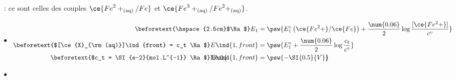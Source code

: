 \documentclass[a4paper, 10pt, landscape, twocolumn]{book}
\begin{document}
\begin{tcb*}[breakable]
\begin{minipage}[c]{.30\linewidth}
\begin{center}
{			}
		\end{center}
	\end{minipage}
	\tcblower
	\begin{enumerate}[label=\sqenumi]
		~: ce sont celles des couples
		$\ce{{Fe}^2+_{\rm(aq)}/Fe}$ et $\ce{{Fe}^3+_{\rm(aq)}/{Fe}^2+_{\rm(aq)}}$.
		\begin{itemize}
			\item
			      \vspace{-15pt}
			      \begin{align*}
				      \beforetext{\hspace{2.5cm}$\Ra$}
				      E_1
				                     & =
				      \psw{%
					      E_1^\circ \left( \ce{Fe^2+}/\ce{Fe} \right) +
					      \frac{\num{0.06}}{2} \log \frac{[\ce{Fe^2+}]}{c^\circ}
				      }%
				      \\
				      \beforetext{$[\ce{X}_{\rm(aq)}]\ind{front} = c_t \Ra $}
				      E\ind{1,front} & =
				      \psw{E_1^\circ + \frac{\num{0.06}}{2}\log \frac{c_t}{c^\circ}}
				      \\
				      \beforetext{$c_t = \SI{e-2}{mol.L^{-1}} \Ra$}
				      \makebox[0pt][l]{$\xul{\phantom{E\ind{1,front} = - \SI{0.5}{V}}}$}
				      E\ind{1,front} & =
				      \psw{- \SI{0.5}{V}}
			      \end{align*}
			      \vspace{-15pt}
			\item
			      \vspace{-15pt}
		\end{itemize}

\end{enumerate}
\end{tcb*}
\end{document}
